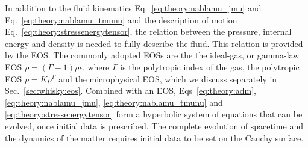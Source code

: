 In addition to the fluid kinematics Eq.~\eqref{eq:theory:nablamu_jmu} and Eq.~\eqref{eq:theory:nablamu_tmunu}
and the description of motion Eq.~\eqref{eq:theory:stressenergytensor}, the relation between the pressure, 
internal energy and density is needed to fully describe the fluid. 
This relation is provided by the \ac{EOS}.
%
The commonly adopted \acp{EOS} are the the ideal-gas, or gamma-law \ac{EOS} $\rho = (\Gamma-1)\rho\epsilon$, 
where $\Gamma$ is the polytropic index of the gas, the polytropic \ac{EOS} $p = K\rho^{\Gamma}$ 
and the microphysical \ac{EOS}, which we discuss separately in Sec.~\ref{sec:whisky:eos}.
%
Combined with an \ac{EOS}, Eqs~\eqref{eq:theory:adm}, \eqref{eq:theory:nablamu_jmu}, \eqref{eq:theory:nablamu_tmunu} 
and \eqref{eq:theory:stressenergytensor} form a hyperbolic system of equations that can be evolved, 
once initial data is prescribed. 
The complete evolution of spacetime and the dynamics of the matter 
requires initial data to be set on the Cauchy surface.



